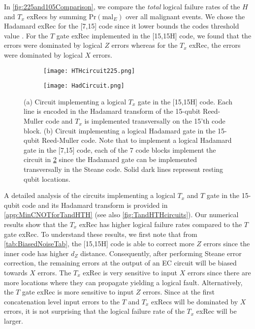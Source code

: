 \documentclass[pra,longbibliography,twocolumn,showpacs,nofootinbib,superscriptaddress,notitlepage]{revtex4-1}
\begin{document}
In \cref{fig:225and105Comparison}, we compare the \textit{total} logical failure rates of the $H$ and $T_x$ exRecs by summing $\mathrm{Pr}(\mathrm{mal}_{E})$ over all malignant events. We chose the Hadamard exRec for the [7,15] code since it lower bounds the codes threshold value \cite{CJL16}. For the $T$ gate exRec implemented in the [15,15H] code, we found that the errors were dominated by logical $Z$ errors whereas for the $T_x$ exRec, the errors were dominated by logical $X$ errors. 

\begin{figure}[h]%
\centering
\begin{subfigure}{0.35\textwidth}
\texttt{[image: HTHcircuit225.png]}
\caption{}
\label{fig:HTHcircuit1}
\end{subfigure}
\begin{subfigure}{0.4\textwidth}
\texttt{[image: HadCircuit.png]}
\caption{}
\label{fig:HadCircuit}
\end{subfigure}
\caption{ (a) Circuit implementing a logical $T_{x}$ gate in the [15,15H] code. Each line is encoded in the Hadamard transform of the 15-qubit Reed-Muller code and $T_{x}$ is implemented transversally on the 15'th code block. (b) Circuit implementing a logical Hadamard gate in the 15-qubit Reed-Muller code. Note that to implement a logical Hadamard gate in the [7,15] code, each of the 7 code blocks implement the circuit in \cref{fig:HadCircuit} since the Hadamard gate can be implemented transversally in the Steane code. Solid dark lines represent resting qubit locations.}
\label{fig:HTHandHadcircuits}
\end{figure}

A detailed analysis of the circuits implementing a logical $T_{x}$ and $T$ gate in the 15-qubit code and its Hadamard transform is provided in \cref{app:MinCNOTforTandHTH} (see also \cref{fig:TandHTHcircuits}). Our numerical results show that the $T_x$ exRec has higher logical failure rates compared to the $T$ gate exRec. To understand these results, we first note that  from \cref{tab:BiasedNoiseTab}, the [15,15H] code is able to correct more $Z$ errors since the inner code has higher $d_{Z}$ distance. Consequently, after performing Steane error correction, the remaining errors at the output of an EC circuit will be biased towards $X$ errors. The $T_{x}$ exRec is very sensitive to input $X$ errors since there are more locations where they can propagate yielding a logical fault. Alternatively, the $T$ gate exRec is more sensitive to input $Z$ errors. Since at the first concatenation level input errors to the $T$ and $T_{x}$ exRecs will be dominated by $X$ errors, it is not surprising that the logical failure rate of the $T_{x}$ exRec will be larger.
\end{document}

